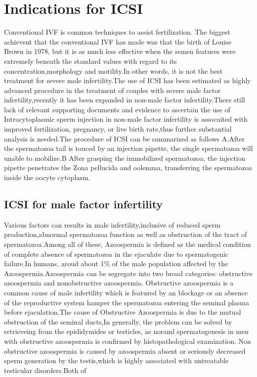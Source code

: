 \documentclass[12pt]{article}
\begin{document}
\section{Indications for ICSI}
Conventional IVF is common techniques to assist fertilization. The biggest achievent that the conventional IVF has made was that the birth of Louise Brown in 1978, but it is as much  less effective when the semen features were extremely beneath the standard values with regard to its concentration,morphology and motility.In other words, it is not the best treatment for severe male infertility.The use of ICSI has been estimated as highly advanced procedure in the treatment  of couples with severe male factor infertility,recently it has been expanded in non-male factor infertility.There still lack of relevant supporting documents and evidence to ascertain the use of 
Intracytoplasmic sperm injection in non-male factor infertility is assocaited with improved fertilization, pregnancy, or live birth rate,thus further substantial analysis is needed.The procedure of ICSI can be summarized as follows A.After the  spermatozoa tail is touced by an injection pipette, the single spermatozoa will unable to mobilize.B
After grasping the immobilized spermatozoa, the injection pipette penetrates the Zona pellucida and oolemma, transferring the spermatozoa inside the oocyte cytoplasm.


\subsection{ICSI for male factor infertility}
Various factors can results in male infertility,inclusive of reduced sperm production,abnormal spermatozoa function as well as  obstruction of the tract of spermatozoa.Among all of these, Azoospermia is defined as the medical condition of complete absence of spermatozoa in the ejaculate due to spermatogenic failure.In humans, aroud about 1\% of the male population affected by the Azoospermia.Azoospermia can be segregate into two broad categories: obstructive azoospermia and nonobstructive azoospermia. Obstructive azoospermia is a common cause of male infertility which is featured by an blockage or an absence of the reproductive system hamper the spermatozoa entering the seminal plasma before ejaculation.The cause of Obstructive Azoospermia is due to the mutual obstruction of the seminal ducts,In generally, the problem can be solved by retrieveing from the epididymides or testicles, as noraml spermatogenesis in men with obstructive azoospermia is confirmed by histopathological examination. Non obstructive azoospermia is caused by azoospermia absent or seriously decreased sperm generation by the testis,which is highly associated with untreatable testicular disorders.Both of 
\end{document}
